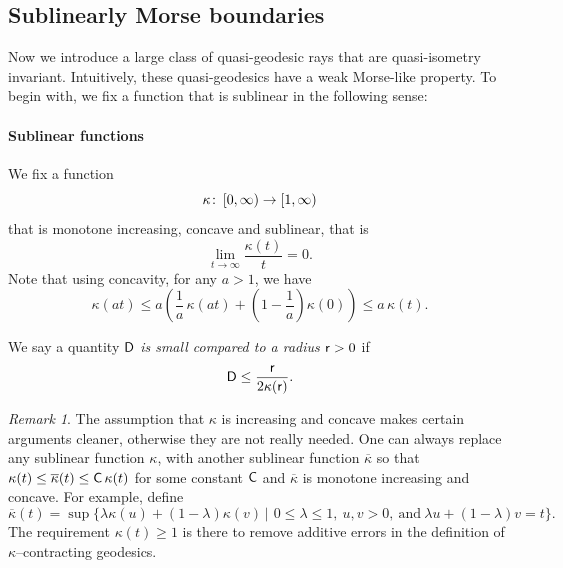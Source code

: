 \documentclass{amsart}
\theoremstyle{definition}
\theoremstyle{remark}
\newtheorem*{rem}{Remark}
\newcommand{\sD}{{\sf D}}
\newcommand{\sC}{{\sf C}}
\newcommand{\from}{\colon\thinspace}
\newcommand{\ST}{\,\mathbin{\Big|}\,}
\newcommand{\rr}{{\sf r}}
\begin{document}
\subsection{Sublinearly Morse boundaries}\label{sec: sublinear morse bdry}
 


Now we introduce a large class of quasi-geodesic rays that are quasi-isometry invariant. Intuitively, these quasi-geodesics have a weak Morse-like property. To begin with, we fix a function that is sublinear in the following sense:
\newline 
\paragraph{\textbf{Sublinear functions}}
We fix a function 
\[
\kappa \from [0,\infty) \to [1,\infty)
\] 
that is monotone increasing, concave and sublinear, that is
\[
\lim_{t \to \infty} \frac{\kappa(t)} t = 0. 
\]
Note that using concavity, for any $a>1$, we have
\begin{equation} \label{Eq:Concave}
\kappa(a t) \leq a \left( \frac 1a \, \kappa (a t) + \left(1- \frac 1a\right) \kappa(0) \right) 
\leq a \, \kappa(t).
\end{equation}

We say a quantity $\sD$ \emph{is small compared to a radius $\rr>0$} if 
\begin{equation} \label{Eq:Small} 
\sD \leq \frac{\rr}{2\kappa(\rr)}. 
\end{equation} 

\begin{rem}
The assumption that $\kappa$ is increasing and concave makes certain arguments
cleaner, otherwise they are not really needed. One can always replace any 
sublinear function $\kappa$, with another sublinear function $\overline \kappa$
so that $\kappa(t) \leq \overline \kappa(t) \leq \sC \, \kappa(t)$ for some constant $\sC$ 
and $\overline \kappa$ is monotone increasing and concave. For example, define 
\[
\overline \kappa(t) = \sup \Big\{ \lambda \kappa(u) + (1-\lambda) \kappa(v) \ST 
\ 0 \leq \lambda \leq 1, \ u,v>0, \ \text{and}\ \lambda u + (1-\lambda)v =t \Big\}.
\]
The requirement $\kappa(t) \geq 1$ is there to remove additive errors in the definition
of $\kappa$--contracting geodesics. 
\end{rem}
\end{document}
